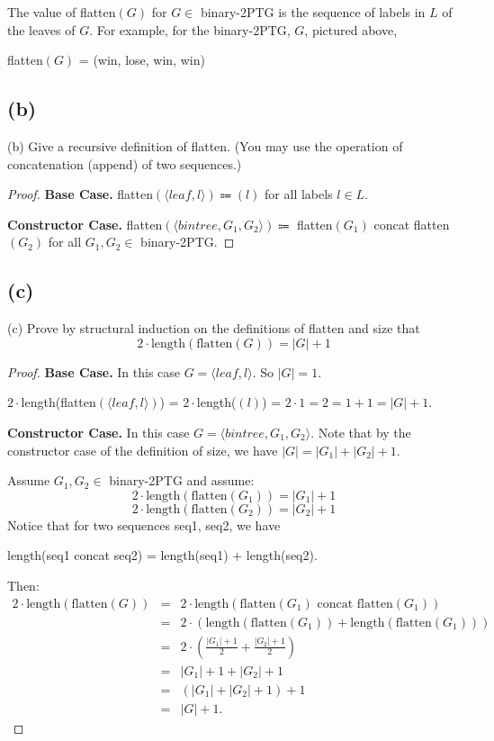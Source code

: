 \documentclass[14pt]{extarticle}
\begin{document}
The value of flatten$(G)$ for $G \in$ binary-2PTG is the sequence of labels in $L$ of the leaves of $G$. For example, for the binary-2PTG, $G$, pictured above, 

\begin{center}
flatten$(G)$ = (win, lose, win, win)
\end{center}

\subsection{(b)}
(b) Give a recursive definition of flatten. (You may use the operation of concatenation (append) of two sequences.)
\begin{proof}
{\bf Base Case.} flatten$(\langle leaf, l\rangle) \Coloneqq (l)$ for all labels $l \in L$.

{\bf Constructor Case.} flatten$(\langle bintree, G_1, G_2\rangle) \Coloneqq$ flatten$(G_1)$ concat flatten$(G_2)$ for all $G_1, G_2 \in$ binary-2PTG.
\end{proof}

\subsection{(c)}
(c) Prove by structural induction on the definitions of flatten and size that 
$$
2 \cdot \text{length}(\text{flatten}(G)) = |G| + 1
$$
\begin{proof}
{\bf Base Case.} In this case $G = \langle leaf, l\rangle$. So $|G| = 1$.

$2 \cdot$length(flatten$(\langle leaf, l\rangle)$) = $2 \cdot$length($(l)$) = $2 \cdot 1 = 2 = 1+1 = |G| + 1$.

{\bf Constructor Case.} In this case $G = \langle bintree, G_1, G_2\rangle$. Note that by the constructor case of the definition of size, we have $|G| = |G_1| + |G_2| + 1$.

Assume $G_1, G_2 \in$ binary-2PTG and assume:
$$
2 \cdot \text{length}(\text{flatten}(G_1)) = |G_1| + 1
$$
$$
2 \cdot \text{length}(\text{flatten}(G_2)) = |G_2| + 1
$$
Notice that for two sequences seq1, seq2, we have 
\begin{center}
length(seq1 concat seq2) = length(seq1) + length(seq2).
\end{center}
Then:
$$
\begin{array}{lcl}
2 \cdot \text{length}(\text{flatten}(G)) & = & 2 \cdot \text{length}(\text{flatten}(G_1) \text{ concat } \text{flatten}(G_1)) \\
 & = & 2 \cdot (\text{length}(\text{flatten}(G_1)) + \text{length}( \text{flatten}(G_1))) \\
& = & 2 \cdot (\frac{|G_1| + 1}{2} + \frac{|G_2| + 1}{2}) \\
& = & |G_1| + 1 + |G_2| + 1 \\
& = & (|G_1| + |G_2| + 1) + 1\\
& = & |G| + 1.
\end{array}
$$
\end{proof}
\end{document}
